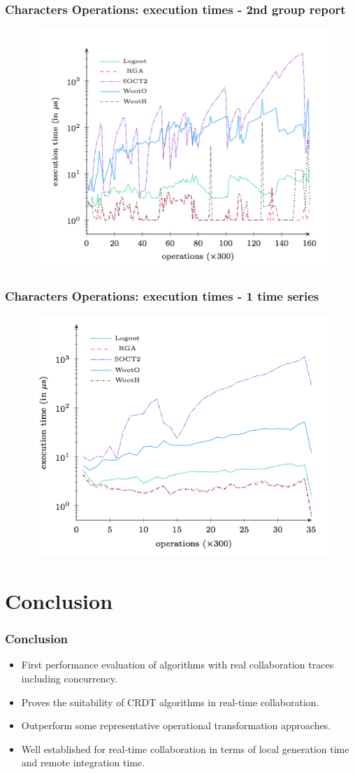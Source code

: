 \documentclass[14pt]{beamer}
\begin{document}
	\begin{frame}
		\frametitle{Characters Operations: execution times - 2nd
group report}
		\begin{figure}
\includegraphics[width=.7\textwidth]{../includes/characters_operations_2g_report.png}
		\end{figure}
	\end{frame}
	\begin{frame}
		\frametitle{Characters Operations: execution times - 1 time
series}
		\begin{figure}
			\includegraphics[width=.7\textwidth]{../includes/characters_operations_1t_big.png}
		\end{figure}
	\end{frame}
	
\section{Conclusion}
	\begin{frame}
		\frametitle{Conclusion}
		\begin{itemize}
			\item First performance evaluation of algorithms with real collaboration traces including concurrency.
			\item Proves the suitability of CRDT algorithms in real-time collaboration.
			\item Outperform some representative operational transformation approaches.
			\item Well established for real-time collaboration in terms of local generation time and remote integration time.
		\end{itemize}
	\end{frame}
\end{document}
